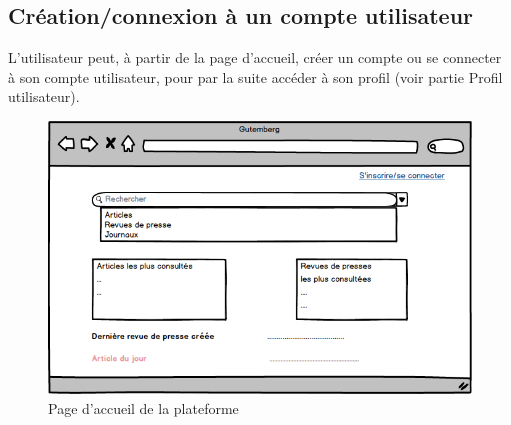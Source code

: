 \subsection{Création/connexion à un compte utilisateur}
\label{sec:arrivee_utilisateur}
L’utilisateur peut, à partir de la page d'accueil, créer un compte ou se connecter à son compte utilisateur, pour par la suite accéder à son profil (voir partie Profil utilisateur).

    \begin{figure}[H]
        \centering
        \includegraphics[width=\textwidth]{figures/Accueil.png}
            \caption{Page d'accueil de la plateforme}
            \label{fig:accueil}
    \end{figure}